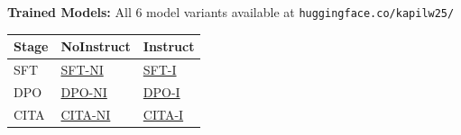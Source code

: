 \documentclass[11pt,twocolumn]{article}
\begin{document}
\smallskip
\noindent\textbf{Trained Models:} All 6 model variants available at \texttt{huggingface.co/kapilw25/}

\begin{table}[H]
\centering
\footnotesize
\begin{tabular}{@{}lll@{}}
\toprule
\textbf{Stage} & \textbf{NoInstruct} & \textbf{Instruct} \\
\midrule
SFT & \href{https://huggingface.co/kapilw25/llama3-8b-pku-SFT-NoInstruct-Baseline-NoInstruct}{SFT-NI} & \href{https://huggingface.co/kapilw25/llama3-8b-pku-SFT-Instruct-Baseline-NoInstruct}{SFT-I} \\
DPO & \href{https://huggingface.co/kapilw25/llama3-8b-pku-DPO-NoInstruct-SFT-NoInstruct}{DPO-NI} & \href{https://huggingface.co/kapilw25/llama3-8b-pku-DPO-Instruct-SFT-Instruct}{DPO-I} \\
CITA & \href{https://huggingface.co/kapilw25/llama3-8b-pku-CITA-NoInstruct-DPO-NoInstruct}{CITA-NI} & \href{https://huggingface.co/kapilw25/llama3-8b-pku-CITA-Instruct-DPO-Instruct}{CITA-I} \\
\bottomrule
\end{tabular}
\end{table}



\end{document}
